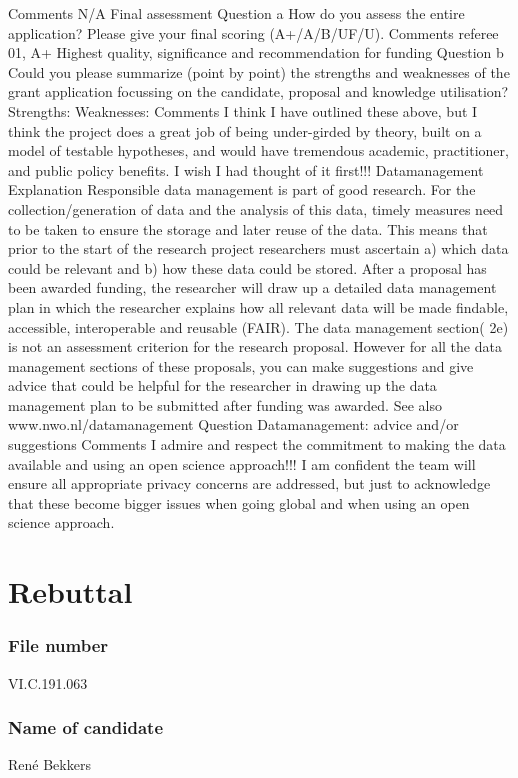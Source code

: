 \documentclass[twocolumn, serif, rga, numeric]{jote-article}
\begin{document}
Comments
N/A
Final assessment
Question a
How do you assess the entire application? Please give your final scoring (A+/A/B/UF/U).
Comments referee
01, A+ Highest quality, significance and recommendation for funding
Question b
Could you please summarize (point by point) the strengths and weaknesses of the grant application focussing on the candidate, proposal and knowledge utilisation? Strengths:
Weaknesses:
Comments
I think I have outlined these above, but I think the project does a great job of being under-girded by theory, built on a model of testable hypotheses, and would have tremendous academic, practitioner, and public policy benefits.
I wish I had thought of it first!!!
Datamanagement
Explanation
Responsible data management is part of good research. For the collection/generation of data and the analysis of this data, timely measures need to be taken to ensure the storage and later reuse of the data. This means that prior to the start of the research project researchers must ascertain a) which data could be relevant and b) how these data could be stored. After a proposal has been awarded funding, the researcher will draw up a detailed data management plan in which the researcher explains how all relevant data will be made findable, accessible, interoperable and reusable (FAIR). The data management section( 2e) is not an assessment criterion for the research proposal. However for all the data management sections of these proposals, you can make suggestions and give advice that could be helpful for the researcher in drawing up the data management plan to be submitted after funding was awarded. See also www.nwo.nl/datamanagement
Question
Datamanagement: advice and/or suggestions
Comments
I admire and respect the commitment to making the data available and using an open science approach!!!
I am confident the team will ensure all appropriate privacy concerns are addressed, but just to acknowledge that these become bigger issues when going global and when using an open science approach.


\section{Rebuttal}
\subsubsection{File number}
VI.C.191.063
\subsubsection{Name of candidate}
René Bekkers
\end{document}
